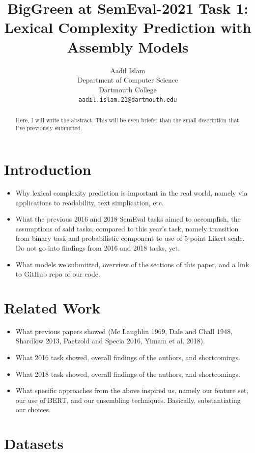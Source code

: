 \documentclass[11pt,a4paper]{article}
\title{BigGreen at SemEval-2021 Task 1: \\
Lexical Complexity Prediction with Assembly Models}
\author{
  Aadil Islam\\
  Department of Computer Science\\
  Dartmouth College\\
  \texttt{aadil.islam.21@dartmouth.edu}
}
\date{}
\begin{document}
\maketitle
\begin{abstract}
  Here, I will write the abstract. This will be even briefer than the small description that I've previously submitted.
\end{abstract}

\section{Introduction}

\begin{itemize}
  \item Why lexical complexity prediction is important in the real world, namely via applications to readability, text simplication, etc.
  \item What the previous 2016 and 2018 SemEval tasks aimed to accomplish, the assumptions of said tasks, compared to this year's task, namely transition from binary task and probabilistic component to use of 5-point Likert scale. Do not go into findings from 2016 and 2018 tasks, yet.
  \item What models we submitted, overview of the sections of this paper, and a link to GitHub repo of our code.
\end{itemize}

\section{Related Work}

\begin{itemize}
  \item What previous papers showed (Mc Laughlin 1969, Dale and Chall 1948, Shardlow 2013, Paetzold and Specia 2016, Yimam et al. 2018).
  \item What 2016 task showed, overall findings of the authors, and shortcomings. 
  \item What 2018 task showed, overall findings of the authors, and shortcomings.
  \item What specific approaches from the above inspired us, namely our feature set, our use of BERT, and our ensembling techniques. Basically, substantiating our choices.
\end{itemize}

\section{Datasets}
\end{document}
